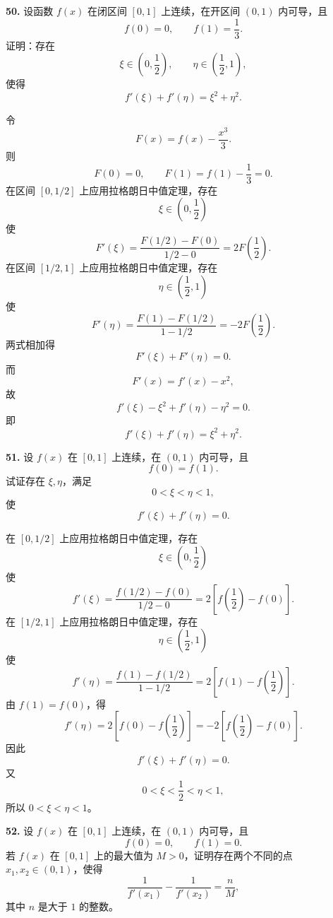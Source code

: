 \begin{problemblock}
\textbf{50.} 设函数 \(f(x)\) 在闭区间 \([0,1]\) 上连续，在开区间 \((0,1)\) 内可导，且
\[
f(0)=0,\qquad f(1)=\frac13.
\]
证明：存在
\[
\xi\in\left(0,\frac12\right),\qquad
\eta\in\left(\frac12,1\right),
\]
使得
\[
f'(\xi)+f'(\eta)=\xi^2+\eta^2.
\]
\end{problemblock}

\begin{solutionblock}
令
\[
F(x)=f(x)-\frac{x^3}{3}.
\]
则
\[
F(0)=0,\qquad F(1)=f(1)-\frac13=0.
\]
在区间 \([0,1/2]\) 上应用拉格朗日中值定理，存在
\[
\xi\in\left(0,\frac12\right)
\]
使
\[
F'(\xi)=\frac{F(1/2)-F(0)}{1/2-0}=2F\left(\frac12\right).
\]
在区间 \([1/2,1]\) 上应用拉格朗日中值定理，存在
\[
\eta\in\left(\frac12,1\right)
\]
使
\[
F'(\eta)=\frac{F(1)-F(1/2)}{1-1/2}=-2F\left(\frac12\right).
\]
两式相加得
\[
F'(\xi)+F'(\eta)=0.
\]
而
\[
F'(x)=f'(x)-x^2,
\]
故
\[
f'(\xi)-\xi^2+f'(\eta)-\eta^2=0.
\]
即
\[
f'(\xi)+f'(\eta)=\xi^2+\eta^2.
\]
\end{solutionblock}

\begin{problemblock}
\textbf{51.} 设 \(f(x)\) 在 \([0,1]\) 上连续，在 \((0,1)\) 内可导，且
\[
f(0)=f(1).
\]
试证存在 \(\xi,\eta\)，满足
\[
0<\xi<\eta<1,
\]
使
\[
f'(\xi)+f'(\eta)=0.
\]
\end{problemblock}

\begin{solutionblock}
在 \([0,1/2]\) 上应用拉格朗日中值定理，存在
\[
\xi\in\left(0,\frac12\right)
\]
使
\[
f'(\xi)=\frac{f(1/2)-f(0)}{1/2-0}=2\left[f\left(\frac12\right)-f(0)\right].
\]
在 \([1/2,1]\) 上应用拉格朗日中值定理，存在
\[
\eta\in\left(\frac12,1\right)
\]
使
\[
f'(\eta)=\frac{f(1)-f(1/2)}{1-1/2}
=2\left[f(1)-f\left(\frac12\right)\right].
\]
由 \(f(1)=f(0)\)，得
\[
f'(\eta)=2\left[f(0)-f\left(\frac12\right)\right]
=-2\left[f\left(\frac12\right)-f(0)\right].
\]
因此
\[
f'(\xi)+f'(\eta)=0.
\]
又
\[
0<\xi<\frac12<\eta<1,
\]
所以 \(0<\xi<\eta<1\)。
\end{solutionblock}

\begin{problemblock}
\textbf{52.} 设 \(f(x)\) 在 \([0,1]\) 上连续，在 \((0,1)\) 内可导，且
\[
f(0)=0,\qquad f(1)=0.
\]
若 \(f(x)\) 在 \([0,1]\) 上的最大值为 \(M>0\)，证明存在两个不同的点 \(x_1,x_2\in(0,1)\)，使得
\[
\frac{1}{f'(x_1)}-\frac{1}{f'(x_2)}=\frac{n}{M},
\]
其中 \(n\) 是大于 \(1\) 的整数。
\end{problemblock}

